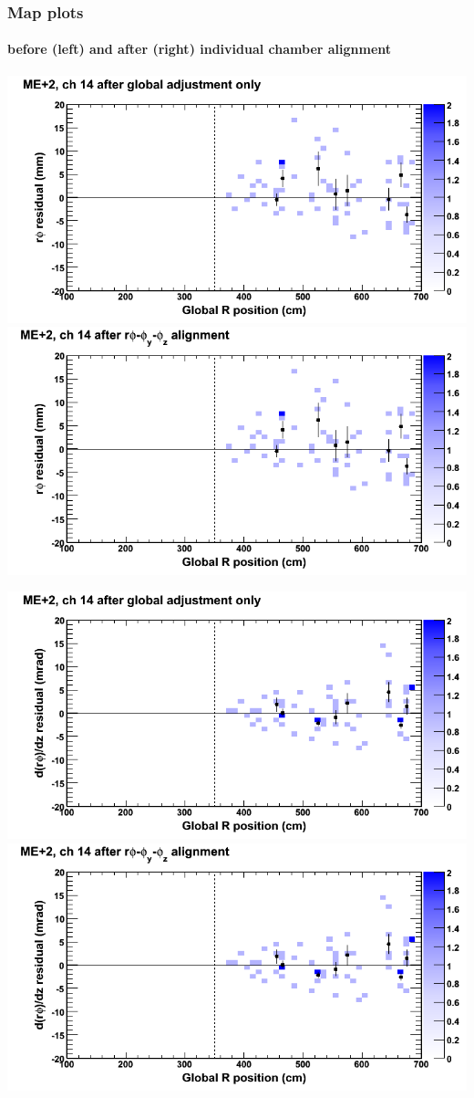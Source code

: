\documentclass[compress]{beamer}
\begin{document}
\begin{frame}
\frametitle{Map plots}
\framesubtitle{before (left) and after (right) individual chamber alignment}
\includegraphics[width=0.5\linewidth]{ringmapplots_3dof/before_CSCvsr_mep2ch14_x.png} \includegraphics[width=0.5\linewidth]{ringmapplots_3dof/after_CSCvsr_mep2ch14_x.png}

\includegraphics[width=0.5\linewidth]{ringmapplots_3dof/before_CSCvsr_mep2ch14_dxdz.png} \includegraphics[width=0.5\linewidth]{ringmapplots_3dof/after_CSCvsr_mep2ch14_dxdz.png}
\end{frame}
\end{document}
